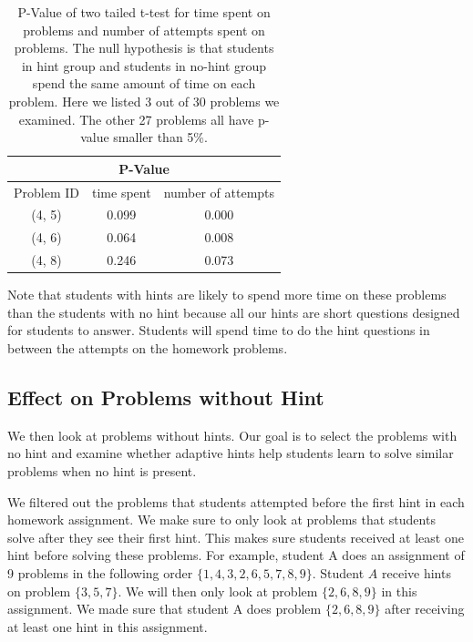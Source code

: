 \documentclass{article} %
\begin{document}
\begin{table}
\captionsetup{font=scriptsize}
\begin{center}
  \begin{tabular}{ c | c | c }
   \multicolumn{3}{c}{P-Value} \\ \hline
   Problem ID & time spent & number of attempts \\ \hline
	(4, 5) & 0.099 & 0.000 \\
	(4, 6) & 0.064 & 0.008 \\
	(4, 8) & 0.246 & 0.073 \\
    \hline
  \end{tabular}
  \caption{P-Value of two tailed t-test for time spent on problems and number of attempts spent on problems. The null hypothesis is that students in hint group and students in no-hint group spend the same amount of time on each problem. Here we listed 3 out of 30 problems we examined. The other 27 problems all have p-value smaller than 5\%.}
  \label{tab:p_val}
  \end{center}
\end{table}

Note that students with hints are likely to spend more time on these problems than the students with no hint because all our hints are short questions designed for students to answer. Students will spend time to do the hint questions in between the attempts on the homework problems.

\subsection{Effect on Problems without Hint}
We then look at problems without hints. Our goal is to select the problems with no hint and examine whether adaptive hints help students learn to solve similar problems when no hint is present.

We filtered out the problems that students attempted before the first hint in each homework assignment. We make sure to only look at problems that students solve after they see their first hint. This makes sure students received at least one hint before solving these problems. For example, student A does an assignment of 9 problems in the following order $\{ 1, 4, 3, 2, 6, 5, 7, 8, 9\}$. Student $A$ receive hints on problem $\{3, 5, 7\}$. We will then only look at problem $\{2, 6, 8, 9\}$ in this assignment. We made sure that student A does problem $\{2, 6, 8, 9\}$ after receiving at least one hint in this assignment.
\end{document}
